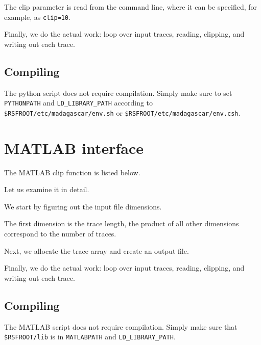 
The clip parameter is read from the command line, where it can be specified,
for example, as \texttt{clip=10}.


Finally, we do the actual work: loop over input traces, reading,
clipping, and writing out each trace.

\subsection{Compiling}

The python script does not require compilation. Simply make sure to set
\texttt{PYTHONPATH} and \texttt{LD\_LIBRARY\_PATH} according to \\
\texttt{\$RSFROOT/etc/madagascar/env.sh} or \texttt{\$RSFROOT/etc/madagascar/env.csh}.

\section{MATLAB interface} %

\lstset{language=matlab}
\renewcommand{\rsfclip}{\RSF/api/matlab/test/clip.m}

The MATLAB clip function is listed below.



Let us examine it in detail. 


We start by figuring out the input file dimensions.


The first dimension is the trace length, the product of all other
dimensions correspond to the number of traces.


Next, we allocate the trace array and create an output file.


Finally, we do the actual work: loop over input traces, reading,
clipping, and writing out each trace.

\subsection{Compiling}

The MATLAB script does not require compilation. Simply make sure that
\texttt{\$RSFROOT/lib} is in \texttt{MATLABPATH} and \texttt{LD\_LIBRARY\_PATH}.

